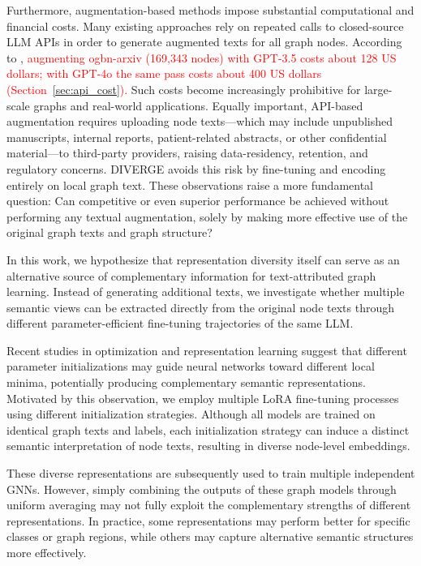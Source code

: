 \documentclass[a4paper,fleqn]{cas-sc}
\newcommand{\revone}[1]{\textcolor{red}{#1}}   %
\begin{document}
Furthermore, augmentation-based methods impose substantial computational and financial costs. Many existing approaches rely on repeated calls to closed-source LLM APIs in order to generate augmented texts for all graph nodes. According to \citet{he2024harnessing}, \revone{augmenting ogbn-arxiv (169{,}343 nodes) with GPT-3.5 costs about 128 US dollars; with GPT-4o the same pass costs about 400 US dollars (Section~\ref{sec:api_cost}).} Such costs become increasingly prohibitive for large-scale graphs and real-world applications. Equally important, API-based augmentation requires uploading node texts---which may include unpublished manuscripts, internal reports, patient-related abstracts, or other confidential material---to third-party providers, raising data-residency, retention, and regulatory concerns. DIVERGE avoids this risk by fine-tuning and encoding entirely on local graph text.
These observations raise a more fundamental question: 
Can competitive or even superior performance be achieved without performing any textual augmentation, solely by making more effective use of the original graph texts and graph structure?

In this work, we hypothesize that representation diversity itself can serve as an alternative source of complementary information for text-attributed graph learning. Instead of generating additional texts, we investigate whether multiple semantic views can be extracted directly from the original node texts through different parameter-efficient fine-tuning trajectories of the same LLM.

Recent studies in optimization and representation learning suggest that different parameter initializations may guide neural networks toward different local minima, potentially producing complementary semantic representations. Motivated by this observation, we employ multiple LoRA fine-tuning processes using different initialization strategies. Although all models are trained on identical graph texts and labels, each initialization strategy can induce a distinct semantic interpretation of node texts, resulting in diverse node-level embeddings.

These diverse representations are subsequently used to train multiple independent GNNs. However, simply combining the outputs of these graph models through uniform averaging may not fully exploit the complementary strengths of different representations. In practice, some representations may perform better for specific classes or graph regions, while others may capture alternative semantic structures more effectively.
\end{document}
